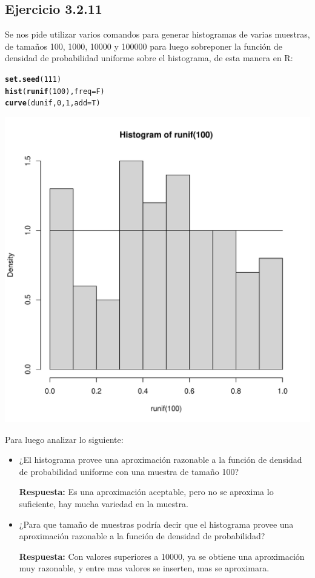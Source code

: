 \documentclass{article}\usepackage[]{graphicx}\usepackage[]{color}
\makeatletter
\def\maxwidth{ %
  \ifdim\Gin@nat@width>\linewidth
    \linewidth
  \else
    \Gin@nat@width
  \fi
}
\newcommand{\hlnum}[1]{\textcolor[rgb]{0.686,0.059,0.569}{#1}}%
\newcommand{\hlstd}[1]{\textcolor[rgb]{0.345,0.345,0.345}{#1}}%
\newcommand{\hlkwc}[1]{\textcolor[rgb]{0.333,0.667,0.333}{#1}}%
\newcommand{\hlkwd}[1]{\textcolor[rgb]{0.737,0.353,0.396}{\textbf{#1}}}%
\newenvironment{kframe}{%
 \def\at@end@of@kframe{}%
 \ifinner\ifhmode%
  \def\at@end@of@kframe{\end{minipage}}%
  \begin{minipage}{\columnwidth}%
 \fi\fi%
 \def\FrameCommand##1{\hskip\@totalleftmargin \hskip-\fboxsep
 \colorbox{shadecolor}{##1}\hskip-\fboxsep
     \hskip-\linewidth \hskip-\@totalleftmargin \hskip\columnwidth}%
 \MakeFramed {\advance\hsize-\width
   \@totalleftmargin\z@ \linewidth\hsize
   \@setminipage}}%
 {\par\unskip\endMakeFramed%
 \at@end@of@kframe}
\newenvironment{knitrout}{}{} %
\makeatother
\begin{document}
\subsection{Ejercicio 3.2.11}
Se nos pide utilizar varios comandos para generar histogramas de varias muestras, de tamaños 100, 1000, 10000 y 100000 para luego sobreponer la función de densidad de probabilidad uniforme sobre el histograma, de esta manera en R: 


\begin{knitrout}
\color{fgcolor}\begin{kframe}
\begin{alltt}
\hlkwd{set.seed}\hlstd{(}\hlnum{111}\hlstd{)}
\hlkwd{hist}\hlstd{(}\hlkwd{runif}\hlstd{(}\hlnum{100}\hlstd{),} \hlkwc{freq}\hlstd{=F)}
\hlkwd{curve}\hlstd{(dunif,} \hlnum{0}\hlstd{,} \hlnum{1}\hlstd{,} \hlkwc{add}\hlstd{=T)}
\end{alltt}
\end{kframe}
\includegraphics[width=\maxwidth]{figure/unnamed-chunk-2-1} 

\end{knitrout}


Para luego analizar lo siguiente:
\begin{itemize}
\item ¿El histograma provee una aproximación razonable a la función de densidad de probabilidad uniforme con una muestra de tamaño 100?

\textbf{Respuesta:} Es una aproximación aceptable, pero no se aproxima lo suficiente, hay mucha variedad en la muestra.
\item 
¿Para que tamaño de muestras podría decir que el histograma provee una aproximación razonable a la función de densidad de probabilidad?

\textbf{Respuesta:} Con valores superiores a 10000, ya se obtiene una aproximación muy razonable, y entre mas valores se inserten, mas se aproximara.

\end{itemize}
\end{document}
